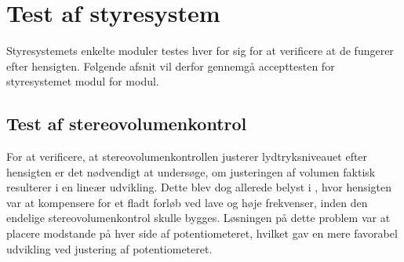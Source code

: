 \section{Test af styresystem}
Styresystemets enkelte moduler testes hver for sig for at verificere at de fungerer efter hensigten. Følgende afsnit vil derfor gennemgå accepttesten for styresystemet modul for modul.    
%
\subsection{Test af stereovolumenkontrol}
For at verificere, at stereovolumenkontrollen justerer lydtryksniveauet efter hensigten er det nødvendigt at undersøge, om justeringen af volumen faktisk resulterer i en lineær udvikling. Dette blev dog allerede belyst i , hvor hensigten var at kompensere for et fladt forløb ved lave og høje frekvenser, inden den endelige stereovolumenkontrol skulle bygges. Løsningen på dette problem var at placere modstande på hver side af potentiometeret, hvilket gav en mere favorabel udvikling ved justering af potentiometeret.\\

